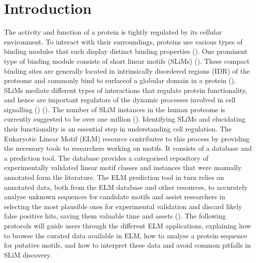 \section*{Introduction}\label{sec:introduction}

The activity and function of a protein is tightly regulated by its
cellular environment. To interact with their surroundings, proteins use
various types of binding modules that each display distinct binding
properties (\cite{10550212}). One prominent type of binding module
consists of short linear motifs (SLiMs) (\cite{18508681}). These compact
binding sites are generally located in intrinsically disordered regions
(IDR) of the proteome and commonly bind to
surfaceof a globular domain in a protein (\cite{21909575}). SLiMs mediate
different types of interactions that regulate protein functionality, and hence
are important regulators of the dynamic processes involved in cell
signalling (\cite{22480932}) (\cite{24926813}). The number of
SLiM instances in the human proteome is currently suggested to be over
one million (\cite{25038412}). Identifying SLiMs and elucidating their
functionality is an essential step in understanding cell regulation. The
Eukaryotic Linear Motif (ELM) resource contributes to this process by
providing the necessary tools to researchers working on motifs. It
consists of a database and a prediction tool. The database provides a
categorised repository of experimentally validated linear motif classes
and instances that were manually annotated form the literature. The ELM
prediction tool in turn relies on annotated data, both from the ELM
database and other resources, to accurately analyse unknown sequences
for candidate motifs and assist researchers in selecting the most
plausible ones for experimental validation and discard likely false
positive hits, saving them valuable time and assets (\cite{22110040}).
The following protocols will guide users through the different ELM
applications, explaining how to browse the curated data available in
ELM, how to analyse a protein sequence for putative motifs, and how to
interpret these data and avoid common pitfalls in SLiM discovery.
